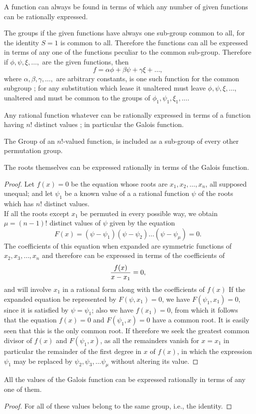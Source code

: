 \begin{corollary}
A function can always be found in terms of which any number of given functions can be rationally expressed.
\end{corollary}
The groups if the given functions have always one sub-group common to all, for the identity $S=1$ is common to all. Therefore the functions can all be expressed in terms of any one of the 
functions peculiar to the common sub-group. Therefore if $\phi, \psi, \xi, \hdots, $ are the given functions, then
\[ f = \alpha\phi + \beta\psi + \gamma\xi + \hdots,\] where $\alpha, \beta, \gamma, \hdots,$ are arbitrary constants, is one such function for the common subgroup ; for any substitution 
which lease it unaltered must leave $\phi, \psi, \xi, \hdots$, unaltered and must be common to the groups of $\phi_1, \psi_1, \xi_1, \hdots$. 

\begin{corollary}
Any rational function whatever can be rationally expressed in terms of a function having $n!$ distinct values ; in particular the Galois function. 
\end{corollary}
The Group of an $n!$-valued function, is included as a sub-group of every other permutation group.

\begin{corollary}
The roots themselves can be expressed rationally in terms of the Galois function.
\end{corollary}

\begin{proof}
Let $f(x) = 0$ be the equation whose roots are $x_1, x_2, \hdots, x_n$, all supposed unequal; and let $\psi_1$ be a known value of a a rational function $\psi$ of the roots which has $n!$ distinct values.\\

If all the roots except $x_1$ be permuted in every possible way, we obtain $\mu = (n-1)!$ distinct values of $\psi$ given by the equation
\[ F(x) = (\psi - \psi_1)(\psi - \psi_2)\hdots (\psi - \psi_\mu) = 0.\] 
The coefficients of this equation when expanded are symmetric functions of $x_2, x_3, \hdots, x_n$ and therefore can  be expressed in terms of the coefficients of 
\[ {f(x) \over x-x_1} = 0, \]
and will involve $x_1$ in a rational form along with the coefficients of $f(x)$ If the expanded equation be represented by $F(\psi, x_1) = 0$, 
we have $F(\psi_1, x_1) = 0$, since it is satisfied by $\psi = \psi_1$; also we have $f(x_1) = 0$, from which it follows that the equation $f(x) = 0$ and $F(\psi_1, x) = 0$ have a common root. 
It is easily seen that this is the only common root. If therefore we seek the greatest common divisor of $f(x)$ and $F(\psi_1, x)$, as all the remainders vanish for $x = x_1$ in particular the remainder of the first degree in 
$x$ of $f(x)$, in which the expression $\psi_1$ may be replaced by $\psi_2, \psi_3, \hdots \psi_\mu$ without altering its value.  
\end{proof}


\begin{corollary}
All the values of the Galois function can be expressed rationally in terms of any one of them. 
\end{corollary}

\begin{proof}
For all of these values belong to the same group, i.e., the identity.
\end{proof}
 